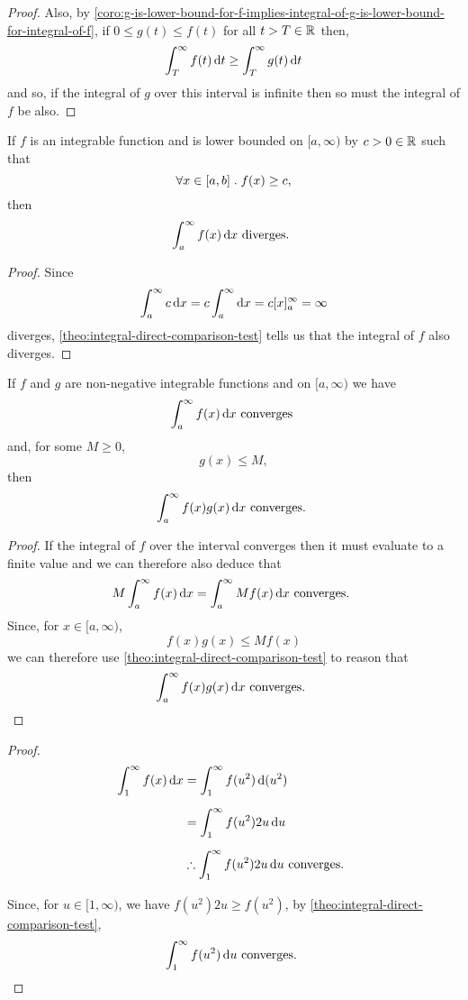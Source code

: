 \documentclass[../MathsNotesBase.tex]{subfiles}
\begin{document}
{\begin{proof}
			Also, by \autoref{coro:g-is-lower-bound-for-f-implies-integral-of-g-is-lower-bound-for-integral-of-f}, if ${ 0 \leq g(t) \leq f(t) }$ for all ${ t > T \in \mathbb{R}^{} }$ then,
			\[ \int_T^\infty f(t) \dif t \geq \int_T^\infty g(t) \dif t \]
			and so, if the integral of $g$ over this interval is infinite then so must the integral of $f$ be also.
		\end{proof}
	
		\medskip
		\begin{corollary}
			If $f$ is an integrable function and is lower bounded on ${ [a,\infty) }$ by ${ c > 0 \in \mathbb{R}^{} }$ such that 
			\[ \forall x \in [a,b] \;.\; f(x) \geq c, \]
			then
			\[ \int_a^\infty f(x) \dif x \text{ diverges. } \]
		\end{corollary}
		\begin{proof}
			Since
			\[ \int_a^\infty c \dif x = c \int_a^\infty \dif x = c [x]_a^\infty = \infty \]
			diverges, \autoref{theo:integral-direct-comparison-test} tells us that the integral of $f$ also diverges.
		\end{proof}
	
		\medskip
		\begin{corollary}
			If $f$ and $g$ are non-negative integrable functions and on ${ [a,\infty) }$ we have
			\[ \int_a^\infty f(x) \dif x \text{ converges } \]
			and, for some ${ M \geq 0 }$,
			\[ g(x) \leq M, \]
			then
			\[ \int_a^\infty f(x)g(x) \dif x \text{ converges. } \]
		\end{corollary}
		\begin{proof}
			If the integral of $f$ over the interval converges then it must evaluate to a finite value and we can therefore also deduce that
			\[ M\int_a^\infty f(x) \dif x = \int_a^\infty Mf(x) \dif x \text{ converges. } \]
			Since, for ${ x \in [a,\infty) }$,
			\[ f(x)g(x) \leq Mf(x) \]
			we can therefore use \autoref{theo:integral-direct-comparison-test} to reason that
			\[ \int_a^\infty f(x)g(x) \dif x \text{ converges. } \qedhere \]
		\end{proof}
	
		\bigskip
		\begin{proof}\nl[4]
			\[\begin{aligned}
				\int_1^\infty f(x) \dif x &= \int_1^\infty f(u^2) \dif\, (u^2) \nn
				&= \int_1^\infty f(u^2) 2u \dif u \nn
				&\therefore \int_1^\infty f(u^2) 2u \dif u \text{ converges. } \nn
			\end{aligned}\]
			Since, for ${ u \in [1,\infty) }$, we have ${ f(u^2) 2u \geq f(u^2) }$, by \autoref{theo:integral-direct-comparison-test},
			\[ \int_1^\infty f(u^2) \dif u \text{ converges. } \]
			

\end{proof}}
\end{document}
